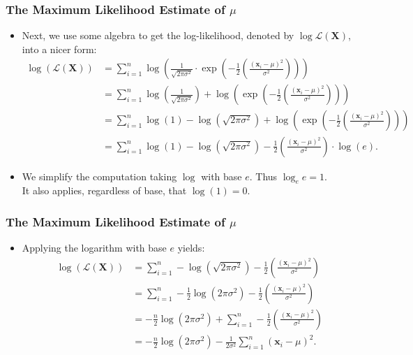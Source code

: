 \begin{frame}
	\frametitle{The Maximum Likelihood Estimate of $\mu$}
	\begin{itemize}
		\item Next, we use some algebra to get the log-likelihood, denoted by $\log \mathcal{L}(\mathbf{X})$, into a nicer form:
		      \begin{align}
			      \log\left(\mathcal{L}(\mathbf{X})\right) & = \sum_{i=1}^{n} \log\left(\frac{1}{\sqrt{2\pi\sigma^2}} \cdot \exp\left( -\frac{1}{2} \left( \frac{(\mathbf{x}_i-\mu)^2}{\sigma^2} \right)\right)\right)              \\
			                                               & = \sum_{i=1}^{n} \log\left(\frac{1}{\sqrt{2\pi\sigma^2}}\right) + \log\left(\exp\left( -\frac{1}{2} \left( \frac{(\mathbf{x}_i-\mu)^2}{\sigma^2} \right)\right)\right) \\
			                                               & = \sum_{i=1}^{n} \log(1) - \log(\sqrt{2\pi\sigma^2}) + \log\left(\exp\left( -\frac{1}{2} \left( \frac{(\mathbf{x}_i-\mu)^2}{\sigma^2} \right)\right)\right)            \\
			                                               & = \sum_{i=1}^{n} \log(1) - \log\left(\sqrt{2\pi\sigma^2}\right) - \frac{1}{2} \left( \frac{(\mathbf{x}_i-\mu)^2}{\sigma^2} \right) \cdot \log(e).
		      \end{align}
		\item We simplify the computation taking $\log$ with base $e$. Thus $\log_e e = 1$. \\
		      It also applies, regardless of base, that $\log(1) = 0$.
	\end{itemize}
\end{frame}


\begin{frame}
	\frametitle{The Maximum Likelihood Estimate of $\mu$}
	\begin{itemize}
		\item Applying the logarithm with base $e$ yields:
		      \begin{align}
			      \log\left(\mathcal{L}(\mathbf{X})\right) & = \sum_{i=1}^{n} - \log\left(\sqrt{2\pi\sigma^2}\right) -\frac{1}{2} \left( \frac{(\mathbf{x}_i-\mu)^2}{\sigma^2} \right)        \\
			                                               & = \sum_{i=1}^{n} - \frac{1}{2} \log\left(2\pi\sigma^2\right) -\frac{1}{2} \left( \frac{(\mathbf{x}_i-\mu)^2}{\sigma^2} \right)   \\
			                                               & = - \frac{n}{2} \log\left(2\pi\sigma^2\right) + \sum_{i=1}^{n} -\frac{1}{2} \left( \frac{(\mathbf{x}_i-\mu)^2}{\sigma^2} \right) \\
			                                               & = - \frac{n}{2} \log\left(2\pi\sigma^2\right) - \frac{1}{2\sigma^2} \sum_{i=1}^{n} (\mathbf{x}_i-\mu)^2.
		      \end{align}
	\end{itemize}
\end{frame}


